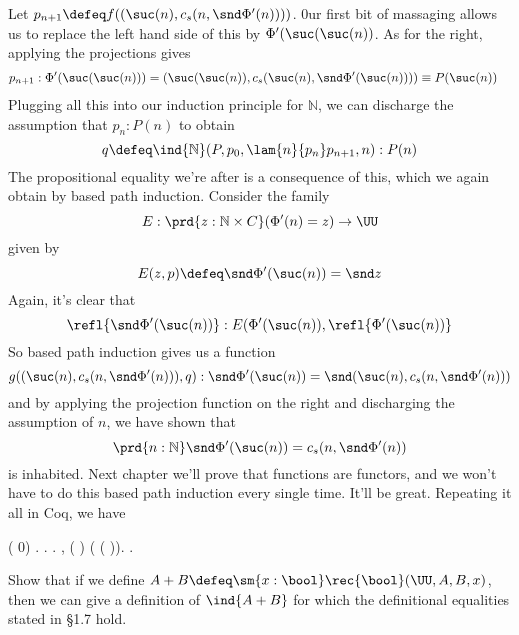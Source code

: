 Let $p_{n+1} \defeq f((\suc(n), c_{s}(n, \snd \Phi'(n))))$.
0ur first bit of massaging allows us to replace the left hand side of this by
$\Phi'(\suc(\suc(n))$.  As for the right, applying the projections gives
\begin{align*}
p_{n+1} &: \Phi'(\suc(\suc(n))) 
=
(\suc(\suc(n)), c_{s}(\suc(n), \snd\Phi'(\suc(n)))) 
\equiv P(\suc(n))
\end{align*}
Plugging all this into our induction principle for $\mathbb{N}$, we can
discharge the assumption that $p_{n} : P(n)$ to obtain
\[
q \defeq \ind{\mathbb{N}}(P, p_{0}, \lam{n}{p_{n}}p_{n+1}, n) : P(n)
\]
The propositional equality we're after is a consequence of this, which we again
obtain by based path induction.  Consider the family
\[
  E : \prd{z:\mathbb{N} \times C}(\Phi'(n) = z) \to \UU
\]
given by
\[
  E(z, p) \defeq 
  \snd\Phi'(\suc(n)) = \snd z
\]
Again, it's clear that
\[
\refl{\snd\Phi'(\suc(n))} : E(\Phi'(\suc(n)), \refl{\Phi'(\suc(n))}
\]
So based path induction gives us a function
\[
  g((\suc(n), c_{s}(n, \snd\Phi'(n))), q) : 
  \snd\Phi'(\suc(n)) = \snd (\suc(n), c_{s}(n, \snd\Phi'(n)))
\]
and by applying the projection function on the right and discharging the
assumption of $n$, we have shown that
\[
  \prd{n:\mathbb{N}}\snd\Phi'(\suc(n)) = c_{s}(n, \snd\Phi'(n))
\]
is inhabited.  Next chapter we'll prove that functions are functors, and we
won't have to do this based path induction every single time.  It'll be great.
Repeating it all in Coq, we have\begin{coqdoccode}
\coqdocemptyline
\coqdocnoindent
{}  ( 0) \coqdocnotation{=} . . .\coqdoceol
\coqdocemptyline
\coqdocnoindent
{} \coqdockw{\ensuremath{\forall}} , ( ) \coqdocnotation{=}     ( ( )). .\coqdoceol
\coqdocemptyline
\coqdocemptyline
\end{coqdoccode}
Show that if we define $A + B \defeq \sm{x:\bool}
\rec{\bool}(\UU, A, B, x)$, then we can give a definition of $\ind{A+B}$ for
which the definitional equalities stated in \S1.7 hold.


